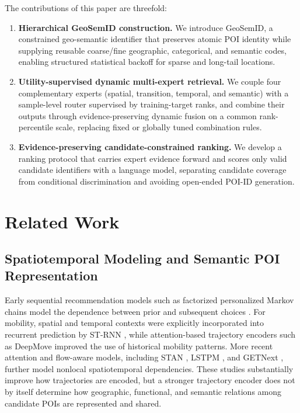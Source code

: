 \documentclass[journal]{IEEEtran}
\begin{document}
The contributions of this paper are threefold:
\begin{enumerate}[leftmargin=*]
\item \textbf{Hierarchical GeoSemID construction.} We introduce GeoSemID, a
constrained geo-semantic identifier that preserves atomic POI identity while
supplying reusable coarse/fine geographic, categorical, and semantic codes,
enabling structured statistical backoff for sparse and long-tail locations.
\item \textbf{Utility-supervised dynamic multi-expert retrieval.} We couple four
complementary experts (spatial, transition, temporal, and semantic) with a
sample-level router supervised by training-target ranks, and combine their
outputs through evidence-preserving dynamic fusion on a common rank-percentile
scale, replacing fixed or globally tuned combination rules.
\item \textbf{Evidence-preserving candidate-constrained ranking.} We develop a
ranking protocol that carries expert evidence forward and scores only valid
candidate identifiers with a language model, separating candidate coverage from
conditional discrimination and avoiding open-ended POI-ID generation.
\end{enumerate}
\section{Related Work}
\label{sec:related_work}

\subsection{Spatiotemporal Modeling and Semantic POI Representation}
\label{subsec:rw_representation}

Early sequential recommendation models such as factorized personalized Markov
chains model the dependence between prior and subsequent choices
\cite{rendle2010}. For mobility, spatial and temporal contexts were explicitly
incorporated into recurrent prediction by ST-RNN \cite{liu2016}, while
attention-based trajectory encoders such as DeepMove \cite{feng2018} improved
the use of historical mobility patterns. More recent attention and flow-aware
models, including STAN \cite{luo2021stan}, LSTPM \cite{sun2020lstpm}, and
GETNext \cite{yang2022}, further model nonlocal
spatiotemporal dependencies. These
studies substantially improve how trajectories are encoded, but a stronger
trajectory encoder does not by itself determine how geographic, functional,
and semantic relations among candidate POIs are represented and shared.
\end{document}
